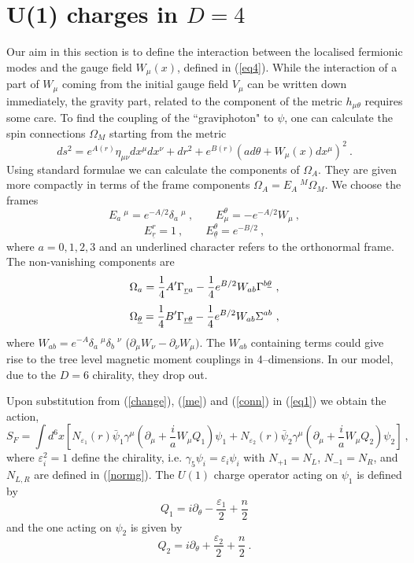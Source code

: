 \documentclass[a4paper,12pt]{article}
\begin{document}
\section{ U(1) charges in $D=4$}
Our aim in this section is to define the interaction between the
localised fermionic modes and the gauge field $W_\mu(x)$, defined in
(\ref{eq4}). While the interaction of a part of $W_\mu$ coming from
the initial gauge field $V_\mu$ can be written down immediately, the
gravity part, related to the component of the metric $h_{\mu\theta}$
requires some care. To find the coupling of the ``graviphoton" to
$\psi$, one can  calculate the spin connections $\Omega_M$ starting
from the metric
\begin{equation}
ds^2 = e^{A(r)} \eta_{\mu\nu} dx^\mu dx^\nu +dr^2 + e^{B(r)}
\left(ad\theta+W_{\mu}(x) dx^\mu\right)^2~.
\label{me}
\end{equation}
Using standard formulae we can calculate the components of
$\Omega_A$.  They are given more compactly in terms of the frame
components $\Omega_A =E_A\ ^M \Omega_M$.  We choose the frames
\begin{equation}
 E_a\ ^\mu = e^{-A/2} \delta_a\ ^\mu~,\qquad E^\theta_\mu =
-e^{-A/2}W_\mu~,
\label{conn}
\end{equation}
\[
 E^r_{\underline r} = 1~,\qquad E^\theta_{\underline\theta} =
e^{-B/2}~,
\]
where $a=0,1,2,3$ and an underlined character refers to the
orthonormal frame.  The non-vanishing components are
\begin{equation}
\Omega_a = {1\over 4} A' \Gamma_{{\underline r} a} -
{1\over 4} e^{B/2} W_{ab}
\Gamma^{b\underline\theta}~,
\end{equation}
\[
\nonumber
\Omega_{\underline\theta} = {1\over 4} B' \Gamma_{{\underline r} 
\underline\theta}
-{1\over 4} e^{B/2} W_{ab}
\Sigma^{ab}~,
\]
where $W_{ab}=e^{-A}\delta_a\ ^\mu \delta_b\ ^\nu$ ($\partial_\mu
W_\nu -\partial_\nu W_\mu)$. The $W_{ab}$ containing terms could give
rise to the tree level magnetic moment couplings in 4--dimensions. 
In our model, due to the $D=6$ chirality, they drop out.

Upon substitution from (\ref{change}), (\ref{me}) and (\ref{conn}) in
(\ref{eq1}) we obtain the action,
\begin{equation}
S_F = \int d^6 x\left[ N_{\varepsilon_1}(r) \bar\psi_1\gamma^\mu
(\partial_\mu + \frac{i}{a}W_\mu Q_1)\psi_1 + N_{\varepsilon_2}(r)
\bar\psi_2\gamma^\mu (\partial_\mu + \frac{i}{a}W_\mu
Q_2)\psi_2\right]~,
\label{SF}
\end{equation}
where $\varepsilon_{i}^2 =1$ define the chirality, i.e.
$\gamma_5\psi_i=\varepsilon_i\psi_i$ with  $N_{+1}=N_L$, 
$N_{-1}=N_R$, and
$N_{L,R}$ are defined in (\ref{normg}). The $U(1)$ charge operator
acting on $\psi_1$ is defined by
\begin{equation}
Q_1 = i\partial_\theta -\frac{\varepsilon_1}{2}+ \frac{n}{2}
\label{Q1}
\end{equation} 
and the one acting on $\psi_2$ is given by
 \begin{equation}
Q_2 = i\partial_\theta +\frac{\varepsilon_2}{2}+ \frac{n}{2}~.
\label{Q2}
\end{equation} 
\end{document}
